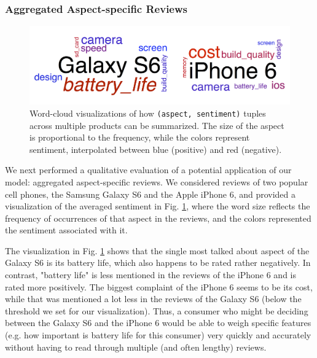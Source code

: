 \documentclass{article} %
\begin{document}
\subsubsection{Aggregated Aspect-specific Reviews}
\begin{figure}[ht]
\begin{center}
\includegraphics[width=\columnwidth]{productCloud.png}
\end{center}
\caption{Word-cloud visualizations of how \texttt{(aspect, sentiment)} tuples across multiple products can be summarized. The size of the aspect is proportional to the frequency, while the colors represent sentiment, interpolated between blue (positive) and red (negative). }
\label{productFig}
\end{figure}

We next performed a qualitative evaluation of a potential application of our model: aggregated aspect-specific reviews. We considered reviews of two popular cell phones, the Samsung Galaxy S6 and the Apple iPhone 6, and provided a visualization of the averaged sentiment in Fig. \ref{productFig}, where the word size reflects the frequency of occurrences of that aspect in the reviews, and the colors represented the sentiment associated with it. 

The visualization in Fig. \ref{productFig} shows that the single most talked about aspect of the Galaxy S6 is its battery life, which also happens to be rated rather negatively. In contrast, "battery life" is less mentioned in the reviews of the iPhone 6 and is rated more positively. The biggest complaint of the iPhone 6 seems to be its cost, while that was mentioned a lot less in the reviews of the Galaxy S6 (below the threshold we set for our visualization). Thus, a consumer who might be deciding between the Galaxy S6 and the iPhone 6 would be able to weigh specific features (e.g. how important is battery life for this consumer) very quickly and accurately without having to read through multiple (and often lengthy) reviews.
\end{document}
